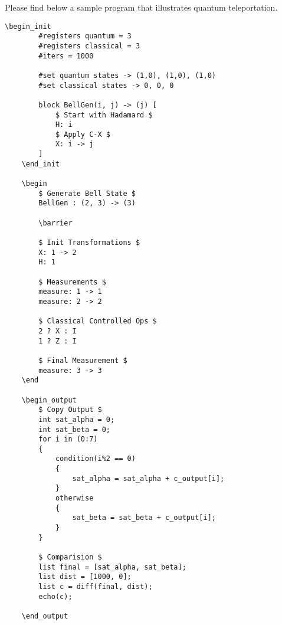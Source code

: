 Please find below a sample program that illustrates quantum teleportation.
\begin{lstlisting}[caption=Quantum Teleportation, label=code:SampleCode]
    \begin_init
        #registers quantum = 3
        #registers classical = 3
        #iters = 1000

        #set quantum states -> (1,0), (1,0), (1,0)
        #set classical states -> 0, 0, 0

        block BellGen(i, j) -> (j) [
            $ Start with Hadamard $
            H: i
            $ Apply C-X $
            X: i -> j
        ]
    \end_init

    \begin
        $ Generate Bell State $
        BellGen : (2, 3) -> (3)
        
        \barrier
        
        $ Init Transformations $
        X: 1 -> 2
        H: 1

        $ Measurements $
        measure: 1 -> 1
        measure: 2 -> 2

        $ Classical Controlled Ops $
        2 ? X : I
        1 ? Z : I

        $ Final Measurement $
        measure: 3 -> 3
    \end

    \begin_output
        $ Copy Output $
        int sat_alpha = 0;
        int sat_beta = 0;
        for i in (0:7)
        {
            condition(i%2 == 0)
            {
                sat_alpha = sat_alpha + c_output[i];
            }
            otherwise
            {
                sat_beta = sat_beta + c_output[i];
            }
        }
        
        $ Comparision $
        list final = [sat_alpha, sat_beta];
        list dist = [1000, 0];
        list c = diff(final, dist);
        echo(c); 

    \end_output
\end{lstlisting}